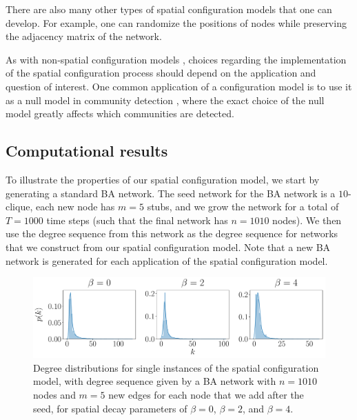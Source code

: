\documentclass[%
 reprint,
 amsmath,amssymb,
 aps,
]{revtex4-1}
\begin{document}
There are also many other types of spatial configuration models that one can develop. For example, one can randomize the positions of nodes while preserving the adjacency matrix of the network. 

As with non-spatial configuration models \cite{fosdick}, choices regarding the implementation of the spatial configuration process should depend on the application and question of interest. One common application of a configuration model is to use it as a null model in community detection \cite{forcechains, community1, community2}, where the exact choice of the null model greatly affects which communities are detected. 



\subsection{Computational results}

To illustrate the properties of our spatial configuration model, we start by generating a standard BA network. The seed network for the BA network is a $10$-clique, each new node has $m=5$ stubs, and we grow the network for a total of $T=1000$ time steps (such that the final network has $n=1010$ nodes). We then use the degree sequence from this network as the degree sequence for networks that we construct from our spatial configuration model. {\color{red}Note that a new BA network is generated for each application of the spatial configuration model.}

\begin{figure}
    \centering
    \includegraphics[width=1.0\linewidth]{spatial_configuration_degree_distribution.pdf}
    \caption{Degree distributions for single instances of the spatial configuration 
     model, with degree sequence given by a BA network with $n=1010$ nodes and $m=5$ new edges for each node that we add after the seed, for spatial decay parameters of $\beta = 0$, $\beta = 2$, and $\beta = 4$.
     }
\end{figure}
\end{document}
